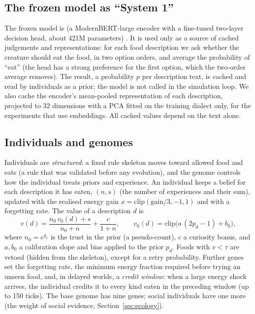 \subsection{The frozen model as ``System 1''}
\label{sec:laya}
The frozen model is \laya{} (a ModernBERT-large encoder with a fine-tuned two-layer decision head, about 421M parameters) . It is used only as a source of cached judgements and representations: for each food description we ask whether the creature should eat the food, in two option orders, and average the probability of ``eat'' (the head has a strong preference for the first option, which the two-order average removes). The result, a probability $p$ per description text, is cached and read by individuals as a prior; the model is not called in the simulation loop. We also cache the encoder's mean-pooled representation of each description, projected to 32 dimensions with a PCA fitted on the training dialect only, for the experiments that use embeddings. All cached values depend on the text alone.

\subsection{Individuals and genomes}
\label{sec:individuals}
Individuals are \emph{structured}: a fixed rule skeleton moves toward allowed food and eats (a rule that was validated before any evolution), and the genome controls how the individual treats priors and experience. An individual keeps a belief for each description it has eaten, $(n,s)$ (the number of experiences and their sum), updated with the realised energy gain $x=\mathrm{clip}(\mathrm{gain}/3,-1,1)$ and with a forgetting rate. The value of a description $d$ is
\begin{equation}
v(d)=\frac{n_0\,v_0(d)+s}{n_0+n}+\frac{c}{1+n},\qquad v_0(d)=\mathrm{clip}\bigl(a\,(2p_d-1)+b_0\bigr),
\end{equation}
where $n_0=e^{g_1}$ is the trust in the prior (a pseudo-count), $c$ a curiosity bonus, and $a,b_0$ a calibration slope and bias applied to the prior $p_d$. Foods with $v<\tau$ are vetoed (hidden from the skeleton), except for a retry probability. Further genes set the forgetting rate, the minimum energy fraction required before trying an unseen food, and, in delayed worlds, a \emph{credit window}: when a large energy shock arrives, the individual credits it to every kind eaten in the preceding window (up to 150 ticks). The base genome has nine genes; social individuals have one more (the weight of social evidence, Section~\ref{sec:ecology}).

